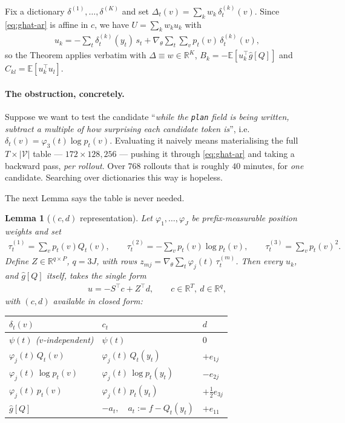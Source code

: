 \documentclass{article}
\theoremstyle{plain}
\newtheorem{lemma}[theorem]{Lemma}
\theoremstyle{definition}
\newcommand{\E}{\mathbb{E}}
\begin{document}
Fix a dictionary $\delta^{(1)},\dots,\delta^{(K)}$ and set $\Delta_t(v)=\sum_k w_k\,\delta^{(k)}_t(v)$.
Since \eqref{eq:ghat-ar} is affine in $c$, we have $U=\sum_k w_k u_k$ with
\begin{align}
u_k=-\sum_t\delta^{(k)}_t(y_t)\,s_t+\nabla_\theta\sum_t\sum_v p_t(v)\,\delta^{(k)}_t(v),
\label{eq:uk}
\end{align}
so the Theorem applies verbatim with $\Delta\equiv w\in\mathbb{R}^K$, $B_k=-\E[u_k^\top\hat g[Q]]$ and
$C_{kl}=\E[u_k^\top u_l]$.

\paragraph{The obstruction, concretely.} Suppose we want to test the candidate ``\emph{while the
\texttt{plan} field is being written, subtract a multiple of how surprising each candidate token is}'',
i.e.\ $\delta_t(v)=\varphi_3(t)\log p_t(v)$. Evaluating it naively means materialising the full
$T\times|\mathcal{V}|$ table --- $172\times128{,}256$ --- pushing it through \eqref{eq:ghat-ar} and taking
a backward pass, \emph{per rollout}. Over $768$ rollouts that is roughly $40$ minutes, for \emph{one}
candidate. Searching over dictionaries this way is hopeless.

The next Lemma says the table is never needed.

\begin{lemma}[$(c,d)$ representation]\label{lem:cd}
Let $\varphi_1,\dots,\varphi_J$ be prefix-measurable position weights and set
\begin{align}
\tau^{(1)}_t=\sum_v p_t(v)Q_t(v),\qquad
\tau^{(2)}_t=-\sum_v p_t(v)\log p_t(v),\qquad
\tau^{(3)}_t=\sum_v p_t(v)^2 .
\end{align}
Define $Z\in\mathbb{R}^{q\times P}$, $q=3J$, with rows $z_{mj}=\nabla_\theta\sum_t\varphi_j(t)\,\tau^{(m)}_t$.
Then every $u_k$, and $\hat g[Q]$ itself, takes the single form
\begin{align}
u=-S^\top c+Z^\top d,\qquad c\in\mathbb{R}^T,\ d\in\mathbb{R}^{q},
\end{align}
with $(c,d)$ available in closed form:
\begin{center}
\begin{tabular}{lll}
\hline
$\delta_t(v)$ & $c_t$ & $d$\\
\hline
$\psi(t)$ \quad ($v$-independent) & $\psi(t)$ & $0$\\
$\varphi_j(t)\,Q_t(v)$ & $\varphi_j(t)\,Q_t(y_t)$ & $+e_{1j}$\\
$\varphi_j(t)\,\log p_t(v)$ & $\varphi_j(t)\,\log p_t(y_t)$ & $-e_{2j}$\\
$\varphi_j(t)\,p_t(v)$ & $\varphi_j(t)\,p_t(y_t)$ & $+\tfrac12 e_{3j}$\\
\hline
$\hat g[Q]$ & $-a_t,\quad a_t:=f-Q_t(y_t)$ & $+e_{11}$\\
\hline
\end{tabular}
\end{center}
\end{lemma}
\end{document}
